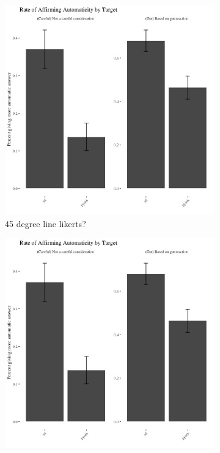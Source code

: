 \documentclass[12pt,letterpaper]{article}
\begin{document}
\begin{figure}
    \begin{subfigure}{.5\textwidth} %
        \centering
        \includegraphics[width=1\linewidth]{Output/Graphs/Experiments/Automaticity/bar chart binary measures.jpg}  %
        \caption{45 degree line likerts?}
        \label{fig:sub-first}
    \end{subfigure}
    \begin{subfigure}{.5\textwidth} %
        \centering
        \includegraphics[width=1\linewidth]{Output/Graphs/Experiments/Automaticity/bar chart binary measures.jpg} 

\end{subfigure}
\end{figure}
\end{document}
